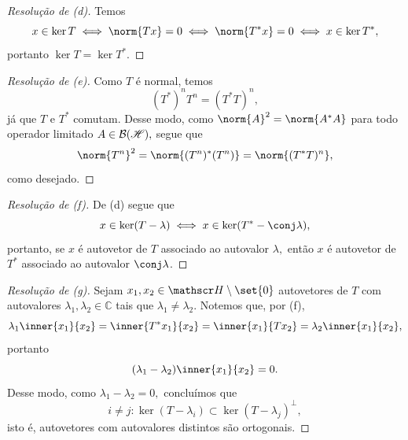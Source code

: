 \begin{proof}[Resolução de (d)]
  Temos
  \begin{equation*}
    x \in \ker T \iff \norm{Tx} = 0 \iff \norm{T^*x} = 0 \iff x \in \ker{T^*},
  \end{equation*}
  portanto \(\ker{T} = \ker{T^*}.\)
\end{proof}
\begin{proof}[Resolução de (e)]
  Como \(T\) é normal, temos
  \begin{equation*}
    (T^*)^n T^n = (T^*T)^n,
  \end{equation*}
  já que \(T\) e \(T^*\) comutam. Desse modo, como \(\norm{A}^2 = \norm{A^*A}\) para todo operador limitado \(A \in \mathcal{B}(\mathscr{H}),\) segue que
  \begin{equation*}
    \norm{T^n}^2 = \norm{(T^n)^*(T^n)} = \norm{(T^*T)^n},
  \end{equation*}
  como desejado.
\end{proof}
\begin{proof}[Resolução de (f)]
  De (d) segue que
  \begin{equation*}
    x \in \ker(T - \lambda) \iff x \in \ker(T^* - \conj\lambda),
  \end{equation*}
  portanto, se \(x\) é autovetor de \(T\) associado ao autovalor \(\lambda,\) então \(x\) é autovetor de \(T^*\) associado ao autovalor \(\conj\lambda\).
\end{proof}
\begin{proof}[Resolução de (g)]
  Sejam \(x_1, x_2 \in \hilbert\setminus\set{0}\) autovetores de \(T\) com autovalores \(\lambda_1, \lambda_2 \in \mathbb{C}\) tais que \(\lambda_1 \neq \lambda_2.\) Notemos que, por (f),
  \begin{equation*}
    \lambda_1 \inner{x_1}{x_2} = \inner{T^*x_1}{x_2} = \inner{x_1}{Tx_2} = \lambda_2 \inner{x_1}{x_2},
  \end{equation*}
  portanto
  \begin{equation*}
    (\lambda_1 - \lambda_2) \inner{x_1}{x_2} = 0.
  \end{equation*}
  Desse modo, como \(\lambda_1 - \lambda_2 = 0,\) concluímos que
  \begin{equation*}
      i \neq j: \ker(T - \lambda_i) \subset \ker(T - \lambda_j)^\perp,
  \end{equation*}
  isto é, autovetores com autovalores distintos são ortogonais.
\end{proof}
